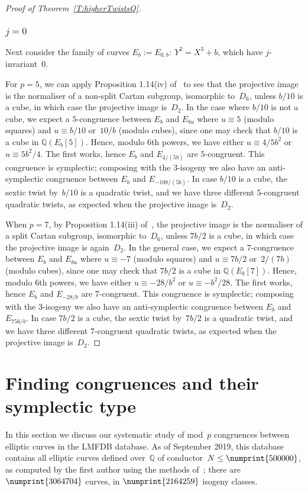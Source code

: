 \documentclass[twoside,leqno,symbols-for-thanks, draft]{rmi}
\numberwithin{equation}{section}
\newcommand{\Q}{\mathbb{Q}}
\theoremstyle{remark}
\begin{document}
\begin{proof}[Proof of Theorem~\ref{T:higherTwistsQ}]
\subsubsection*{$j=0$}
Next consider the family of curves $E_b:=E_{0,b}:\ Y^2=X^3+b$, which
have $j$-invariant~$0$.

For $p=5$, we can apply Proposition 1.14(iv) of~\cite{Zywina} to see
that the projective image is the normaliser of a non-split Cartan
subgroup, isomorphic to~$D_6$, unless $b/10$ is a cube, in which case
the projective image is~$D_2$.  In the case where $b/10$ is not a
cube, we expect a $5$-congruence between $E_b$ and $E_{bu}$ where
$u\equiv5$ (modulo squares) and $u\equiv b/10$ or~$10/b$ (modulo
cubes), since one may check that $b/10$ is a cube in $\Q(E_b[5])$.
Hence, modulo $6$th powers, we have either $u\equiv 4/5b^2$ or
$u\equiv 5b^2/4$.  The first works, hence $E_b$ and $E_{4/(5b)}$ are
$5$-congruent.  This congruence is symplectic; composing with the
$3$-isogeny we also have an anti-symplectic congruence between $E_b$
and $E_{-108/(5b)}$.  In case $b/10$ is a cube, the sextic twist
by~$b/10$ is a quadratic twist, and we have three different
$5$-congruent quadratic twists, as expected when the projective image
is~$D_2$.

When $p=7$, by Proposition 1.14(iii) of~\cite{Zywina}, the projective
image is the normaliser of a split Cartan subgroup, isomorphic
to~$D_6$, unless $7b/2$ is a cube, in which case the projective image
is again~$D_2$.  In the general case, we expect a $7$-congruence
between $E_b$ and $E_{bu}$ where $u\equiv-7$ (modulo squares) and
$u\equiv 7b/2$ or~$2/(7b)$ (modulo cubes), since one may check that
$7b/2$ is a cube in $\Q(E_b[7])$.  Hence, modulo $6$th powers, we have
either $u\equiv -28/b^2$ or $u\equiv -b^2/28$.  The first works, hence
$E_b$ and $E_{-28/b}$ are $7$-congruent.  This congruence is
symplectic; composing with the $3$-isogeny we also have an
anti-symplectic congruence between $E_b$ and $E_{756/b}$. In case
$7b/2$ is a cube, the sextic twist by~$7b/2$ is a quadratic twist, and
we have three different $7$-congruent quadratic twists, as expected
when the projective image is~$D_2$.
\end{proof}

\vfill
\section{Finding congruences and their symplectic type}\label{S:statistics}

In this section we discuss our systematic study of mod~$p$ congruences
between elliptic curves in the LMFDB database.  As of September 2019, this
database contains all elliptic curves defined over~$\Q$ of
conductor~$N\le\numprint{500000}$, as computed by the first author
using the methods of~\cite{AMEC}; there are $\numprint{3064704}$
curves, in $\numprint{2164259}$ isogeny classes.
\end{document}
